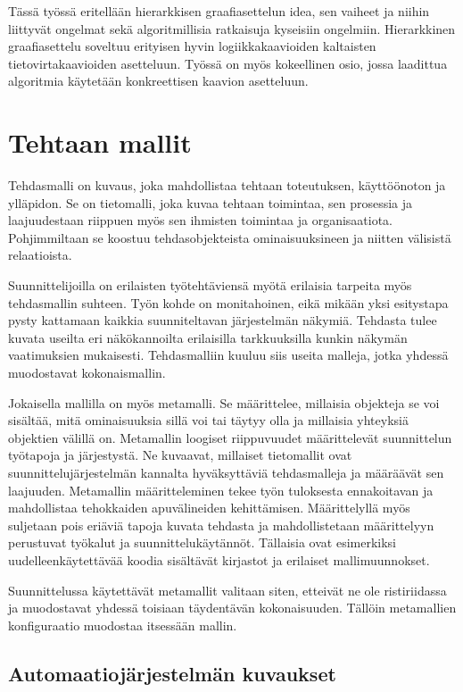 \documentclass[finnish,12pt]{article}
\begin{document}
Tässä työssä eritellään hierarkkisen graafiasettelun idea, sen vaiheet ja niihin liittyvät ongelmat sekä algoritmillisia ratkaisuja kyseisiin ongelmiin.
Hierarkkinen graafiasettelu soveltuu erityisen hyvin logiikkakaavioiden kaltaisten tietovirtakaavioiden asetteluun.
Työssä on myös kokeellinen osio, jossa laadittua algoritmia käytetään konkreettisen kaavion asetteluun.

	\clearpage
	\section{Tehtaan mallit}

Tehdasmalli on kuvaus, joka mahdollistaa tehtaan toteutuksen, käyttöönoton ja ylläpidon.
Se on tietomalli, joka kuvaa tehtaan toimintaa, sen prosessia ja laajuudestaan riippuen myös sen ihmisten toimintaa ja organisaatiota.
Pohjimmiltaan se koostuu tehdasobjekteista ominaisuuksineen ja niitten välisistä relaatioista. \cite{RefWorks:41}

Suunnittelijoilla on erilaisten työtehtäviensä myötä erilaisia tarpeita myös tehdasmallin suhteen.
Työn kohde on monitahoinen, eikä mikään yksi esitystapa pysty kattamaan kaikkia suunniteltavan järjestelmän näkymiä.
Tehdasta tulee kuvata useilta eri näkökannoilta erilaisilla tarkkuuksilla kunkin näkymän vaatimuksien mukaisesti.
Tehdasmalliin kuuluu siis useita malleja, jotka yhdessä muodostavat kokonaismallin.

Jokaisella mallilla on myös metamalli. Se määrittelee, millaisia objekteja se voi sisältää, mitä ominaisuuksia sillä voi tai täytyy olla ja millaisia yhteyksiä objektien välillä on.
Metamallin loogiset riippuvuudet määrittelevät suunnittelun työtapoja ja järjestystä.
Ne kuvaavat, millaiset tietomallit ovat suunnittelujärjestelmän kannalta hyväksyttäviä tehdasmalleja ja
määräävät sen laajuuden. Metamallin määritteleminen tekee työn tuloksesta ennakoitavan ja mahdollistaa tehokkaiden apuvälineiden kehittämisen.
Määrittelyllä myös suljetaan pois eriäviä tapoja kuvata tehdasta ja mahdollistetaan määrittelyyn perustuvat työkalut ja suunnittelukäytännöt.
Tällaisia ovat esimerkiksi uudelleenkäytettävää koodia sisältävät kirjastot ja erilaiset mallimuunnokset.

Suunnittelussa käytettävät metamallit valitaan siten, etteivät ne ole ristiriidassa ja muodostavat yhdessä toisiaan täydentävän kokonaisuuden.
Tällöin metamallien konfiguraatio muodostaa itsessään mallin.


	\subsection{Automaatiojärjestelmän kuvaukset}
\end{document}
